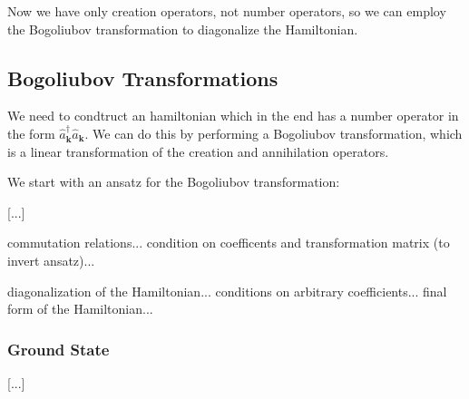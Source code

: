 Now we have only creation operators, not number operators, so we can employ the Bogoliubov transformation to diagonalize the Hamiltonian.

\subsection{Bogoliubov Transformations}

We need to condtruct an hamiltonian which in the end has a number operator in the form \(\hat{a}_\mathbf{k}^\dagger \hat{a}_\mathbf{k}\). We can do this by performing a Bogoliubov transformation, which is a linear transformation of the creation and annihilation operators.

We start with an ansatz for the Bogoliubov transformation:

[...]

commutation relations... condition on coefficents and transformation matrix (to invert ansatz)...

diagonalization of the Hamiltonian... conditions on arbitrary coefficients... final form of the Hamiltonian...

\subsubsection{Ground State}

[...]